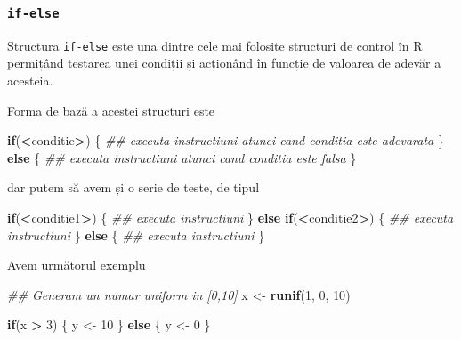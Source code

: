 \documentclass[]{article}
\newenvironment{Shaded}{\begin{snugshade}}{\end{snugshade}}
\newcommand{\CommentTok}[1]{\textcolor[rgb]{0.56,0.35,0.01}{\textit{#1}}}
\newcommand{\ControlFlowTok}[1]{\textcolor[rgb]{0.13,0.29,0.53}{\textbf{#1}}}
\newcommand{\DecValTok}[1]{\textcolor[rgb]{0.00,0.00,0.81}{#1}}
\newcommand{\KeywordTok}[1]{\textcolor[rgb]{0.13,0.29,0.53}{\textbf{#1}}}
\newcommand{\NormalTok}[1]{#1}
\newcommand{\OperatorTok}[1]{\textcolor[rgb]{0.81,0.36,0.00}{\textbf{#1}}}
\newcommand{\StringTok}[1]{\textcolor[rgb]{0.31,0.60,0.02}{#1}}
\newcounter{exo}[section]
\begin{document}
\hypertarget{if-else}{%
\subsubsection{\texorpdfstring{\texttt{if-else}}{if-else}}\label{if-else}}

Structura \texttt{if-else} este una dintre cele mai folosite structuri
de control în R permițând testarea unei condiții și acționând în funcție
de valoarea de adevăr a acesteia.

Forma de bază a acestei structuri este

\begin{Shaded}
\begin{Highlighting}[]
\ControlFlowTok{if}\NormalTok{(}\OperatorTok{<}\NormalTok{conditie}\OperatorTok{>}\NormalTok{) \{}
        \CommentTok{## executa instructiuni atunci cand conditia este adevarata}
\NormalTok{\} }
\ControlFlowTok{else}\NormalTok{ \{}
        \CommentTok{## executa instructiuni atunci cand conditia este falsa}
\NormalTok{\}}
\end{Highlighting}
\end{Shaded}

dar putem să avem și o serie de teste, de tipul

\begin{Shaded}
\begin{Highlighting}[]
\ControlFlowTok{if}\NormalTok{(}\OperatorTok{<}\NormalTok{conditie1}\OperatorTok{>}\NormalTok{) \{}
        \CommentTok{## executa instructiuni}
\NormalTok{\} }\ControlFlowTok{else} \ControlFlowTok{if}\NormalTok{(}\OperatorTok{<}\NormalTok{conditie2}\OperatorTok{>}\NormalTok{)  \{}
        \CommentTok{## executa instructiuni}
\NormalTok{\} }\ControlFlowTok{else}\NormalTok{ \{}
        \CommentTok{## executa instructiuni}
\NormalTok{\}}
\end{Highlighting}
\end{Shaded}

Avem următorul exemplu

\begin{Shaded}
\begin{Highlighting}[]
\CommentTok{## Generam un numar uniform in [0,10]}
\NormalTok{x <-}\StringTok{ }\KeywordTok{runif}\NormalTok{(}\DecValTok{1}\NormalTok{, }\DecValTok{0}\NormalTok{, }\DecValTok{10}\NormalTok{)  }

\ControlFlowTok{if}\NormalTok{(x }\OperatorTok{>}\StringTok{ }\DecValTok{3}\NormalTok{) \{}
\NormalTok{        y <-}\StringTok{ }\DecValTok{10}
\NormalTok{\} }\ControlFlowTok{else}\NormalTok{ \{}
\NormalTok{        y <-}\StringTok{ }\DecValTok{0}
\NormalTok{\}}
\end{Highlighting}
\end{Shaded}
\end{document}
